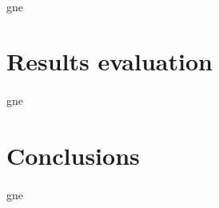 \paragraph{} gne


\section{Results evaluation} \label{sec: step_restults_evaluation}
\paragraph{} gne


\section{Conclusions} \label{sec: step_conclusions}
\paragraph{} gne

